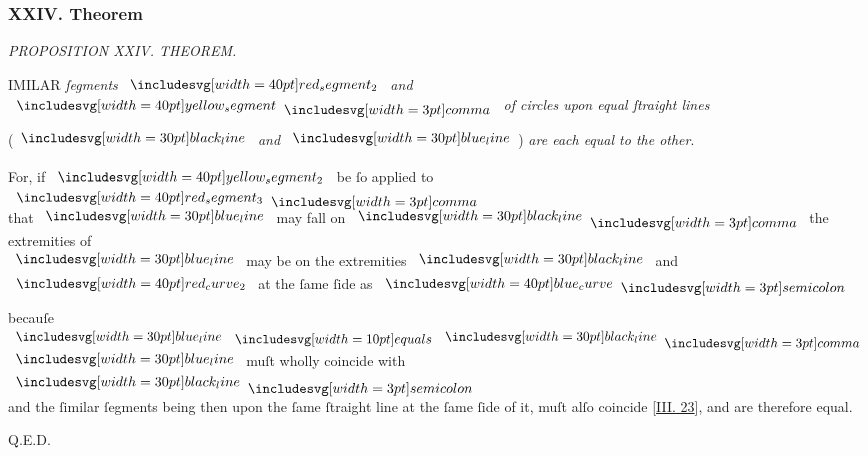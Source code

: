 \documentclass[11pt,preview]{standalone}
\begin{document}
\subsubsection{XXIV. Theorem}

\begin{minipage}[t]{0.43\textwidth}
    \vspace{20pt}
    
\end{minipage}
\hfill
\begin{minipage}[t]{0.54\textwidth}
    \begin{center}
        \textit{PROPOSITION XXIV. THEOREM.}\label{book3pr24} \\
    \end{center}

    \hfill

    \begin{center}
        \raggedright \lettrine[lines=3, loversize=1, nindent=0pt]{}{}IMILAR \textit{ſegments} $\img[0][0][40]{red_segment_2}$ \textit{and} $\img[0][0][40]{yellow_segment} \bcomma$ \textit{of circles upon equal ſtraight lines}
    \end{center}
    (\hspace{-1ex}$\blackline$ \textit{and} $\blueline$\hspace{-1ex}) \textit{are each equal to the other}.
\end{minipage}%

\hfill

\hfill

\begin{center}
    For, if $\img[0][0][40]{yellow_segment_2}$ be ſo applied to $\img[0][0][40]{red_segment_3} \bcomma$\\
    that $\blueline$ may fall on $\blackline \bcomma$ the extremities of\\
    $\blueline$ may be on the extremities $\blackline$ and\\
    $\img[0][0][40]{red_curve_2}$ at the ſame ſide as $\img[0][0][40]{blue_curve} \bsemicolon$
\end{center}

\hfill

\begin{center}
    becauſe $\blueline \bequals \blackline \bcomma$\\
    $\blueline$ muſt wholly coincide with $\blackline \bsemicolon$\\
    and the ſimilar ſegments being then upon the ſame ſtraight line at the ſame ſide of it, muſt alſo coincide [\hyperref[book3pr23]{\textsc{III.} 23}], and are therefore equal.
\end{center}

\hfill

\hfill Q.E.D.
\end{document}
